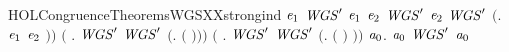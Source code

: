 \begin{SaveVerbatim}{HOLCongruenceTheoremsWGSXXstrongind}
             \ensuremath{\HOLBoundVar{e}\sb{\mathrm{1}}} \HOLSymConst{\HOLTokenConj{}} \ensuremath{\HOLBoundVar{WGS}\sp{\prime}} \ensuremath{\HOLBoundVar{e}\sb{\mathrm{1}}} \HOLSymConst{\HOLTokenConj{}}  \ensuremath{\HOLBoundVar{e}\sb{\mathrm{2}}} \HOLSymConst{\HOLTokenConj{}} \ensuremath{\HOLBoundVar{WGS}\sp{\prime}} \ensuremath{\HOLBoundVar{e}\sb{\mathrm{2}}} \HOLSymConst{\HOLTokenImp{}}
            \ensuremath{\HOLBoundVar{WGS}\sp{\prime}} \ensuremath{(}\HOLTokenLambda{}. \ensuremath{\HOLBoundVar{e}\sb{\mathrm{1}}}  \HOLSymConst{\ensuremath{\mid}} \ensuremath{\HOLBoundVar{e}\sb{\mathrm{2}}} \ensuremath{)}\ensuremath{)} \HOLSymConst{\HOLTokenConj{}}
       \ensuremath{(}\HOLSymConst{\HOLTokenForall{}} .   \HOLSymConst{\HOLTokenConj{}} \ensuremath{\HOLBoundVar{WGS}\sp{\prime}}  \HOLSymConst{\HOLTokenImp{}} \ensuremath{\HOLBoundVar{WGS}\sp{\prime}} \ensuremath{(}\HOLTokenLambda{}.   \ensuremath{(} \ensuremath{)}\ensuremath{)}\ensuremath{)} \HOLSymConst{\HOLTokenConj{}}
       \ensuremath{(}\HOLSymConst{\HOLTokenForall{}} .   \HOLSymConst{\HOLTokenConj{}} \ensuremath{\HOLBoundVar{WGS}\sp{\prime}}  \HOLSymConst{\HOLTokenImp{}} \ensuremath{\HOLBoundVar{WGS}\sp{\prime}} \ensuremath{(}\HOLTokenLambda{}.  \ensuremath{(} \ensuremath{)} \ensuremath{)}\ensuremath{)} \HOLSymConst{\HOLTokenImp{}}
       \HOLSymConst{\HOLTokenForall{}}\ensuremath{\HOLBoundVar{a}\sb{\mathrm{0}}}.  \ensuremath{\HOLBoundVar{a}\sb{\mathrm{0}}} \HOLSymConst{\HOLTokenImp{}} \ensuremath{\HOLBoundVar{WGS}\sp{\prime}} \ensuremath{\HOLBoundVar{a}\sb{\mathrm{0}}}
\end{SaveVerbatim}
\newcommand{\HOLCongruenceTheoremsWGSXXstrongind}{\UseVerbatim{HOLCongruenceTheoremsWGSXXstrongind}}
